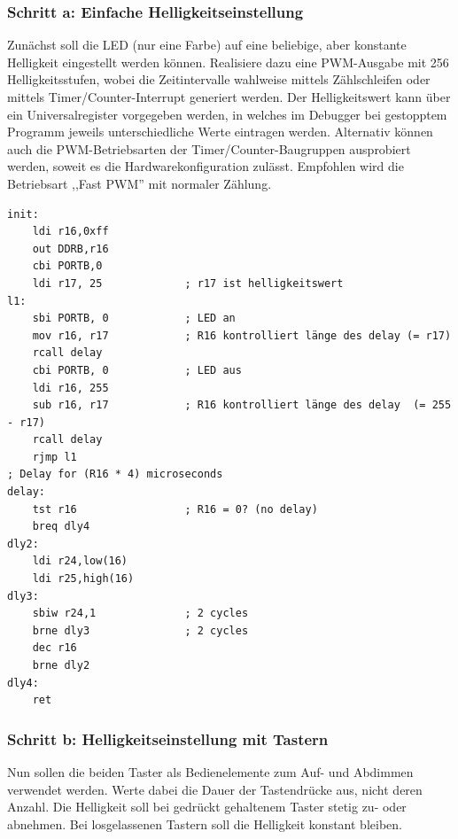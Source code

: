 \documentclass[a4paper,12pt,titlepage]{scrartcl}
\begin{document}
\subsubsection*{Schritt a: Einfache Helligkeitseinstellung}
Zunächst soll die LED (nur eine Farbe) auf eine beliebige, aber konstante Helligkeit eingestellt werden können. Realisiere dazu eine PWM-Ausgabe mit 256 Helligkeitsstufen, wobei die Zeitintervalle wahlweise mittels Zählschleifen oder mittels Timer/Counter-Interrupt generiert werden. Der Helligkeitswert kann über ein Universalregister vorgegeben werden, in welches im Debugger bei gestopptem Programm jeweils unterschiedliche Werte eintragen werden.
Alternativ können auch die PWM-Betriebsarten der Timer/Counter-Baugruppen ausprobiert werden, soweit es die Hardwarekonfiguration zulässt. Empfohlen wird die Betriebsart ,,Fast PWM'' mit normaler Zählung.
\begin{lstlisting}[basicstyle=\tiny]
init:
    ldi r16,0xff            
    out DDRB,r16
    cbi PORTB,0      
    ldi r17, 25             ; r17 ist helligkeitswert
l1:     
    sbi PORTB, 0            ; LED an
    mov r16, r17            ; R16 kontrolliert länge des delay (= r17)
    rcall delay
    cbi PORTB, 0            ; LED aus
    ldi r16, 255
    sub r16, r17            ; R16 kontrolliert länge des delay  (= 255 - r17)
    rcall delay
    rjmp l1
; Delay for (R16 * 4) microseconds
delay:  
    tst r16                 ; R16 = 0? (no delay)
    breq dly4
dly2:       
    ldi r24,low(16)
    ldi r25,high(16)
dly3:       
    sbiw r24,1              ; 2 cycles
    brne dly3               ; 2 cycles
    dec r16
    brne dly2
dly4:       
    ret  
\end{lstlisting}

\newpage
\subsubsection*{Schritt b: Helligkeitseinstellung mit Tastern}
Nun sollen die beiden Taster als Bedienelemente zum Auf- und Abdimmen verwendet werden. Werte dabei die Dauer der Tastendrücke aus, nicht deren Anzahl. Die Helligkeit soll bei gedrückt gehaltenem Taster stetig zu- oder abnehmen. Bei losgelassenen Tastern soll die Helligkeit konstant bleiben.
\end{document}
